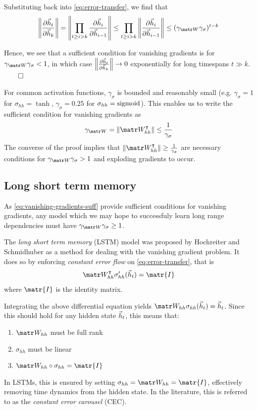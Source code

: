 Substituting back into \autoref{eq:error-transfer}, we find that
\begin{equation}
    \left\| \frac{\pd \h_t}{\pd \h_k} \right\|
    = \left\| \prod_{t \geq i > k} \frac{\pd \h_i}{\pd \h_{i-1}} \right\|
    \leq  \prod_{t \geq i > k} \left\| \frac{\pd \h_i}{\pd \h_{i-1}} \right\|
    \leq (\gamma_{\W} \gamma_\sigma)^{t-k}
\end{equation}

Hence, we see that a sufficient condition for vanishing gradients is
for $\gamma_{\W} \gamma_\sigma < 1$, in which case $\left\| \frac{\partial \vec{h}_t}{\partial \vec{h}_k} \right\| \to 0$
exponentially for long timespans $t \gg k$. $\qed$

For common activation functions, $\gamma_\sigma$ is bounded and reasonably
small (e.g. $\gamma_\sigma = 1$ for $\sigma_{hh} = \tanh$, $\gamma_\sigma =
0.25$ for $\sigma_{hh} = \operatorname*{sigmoid}$). This enables us to write the sufficient
condition for vanishing gradients as
\begin{equation}
    \gamma_{\W} = \| \W_{hh}^\tp \| \leq \frac{1}{\gamma_\sigma}
    \label{eq:vanishing-gradients-suff}
\end{equation}
The converse of the proof implies that $\| \W_{hh}^\tp \| \geq
\frac{1}{\gamma_\sigma}$ are necessary conditions for $\gamma_{\W}
\gamma_\sigma > 1$ and exploding gradients to occur.

\subsection{Long short term memory}

As \autoref{eq:vanishing-gradients-suff} provide sufficient conditions for
vanishing gradients, any model which we may hope to successfuly learn long range
dependencies must have $\gamma_{\W} \gamma_\sigma \geq 1$.

The \emph{long short term memory} (LSTM) model was proposed by Hochreiter and
Schmidhuber \cite{hochreiter1997long} as a method for dealing with
the vanishing gradient problem. It does so by enforcing \emph{constant error flow}
on \autoref{eq:error-transfer}, that is
\begin{equation}
    \W_{hh}^\tp \sigma_{hh}' (\h_{t}) = \matr{I}
\end{equation}
where $\matr{I}$ is the identity matrix.

Integrating the above differential equation yields $\W_{hh} \sigma_{hh}(\h_{t}) = \h_{t}$.
Since this should hold for any hidden state $\vec{h}_{t}$, this means that:
\begin{enumerate}
    \item $\W_{hh}$ must be full rank
    \item $\sigma_{hh}$ must be linear
    \item $\W_{hh} \circ \sigma_{hh} = \matr{I}$
\end{enumerate}
In LSTMs, this is ensured by setting $\sigma_{hh} = \W_{hh} = \matr{I}$, effectively removing
time dynamics from the hidden state. In the literature, this is referred to as
the \emph{constant error carousel} (CEC).

